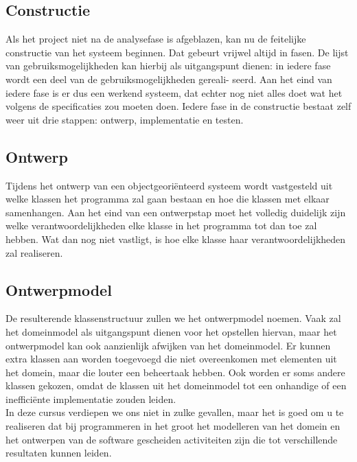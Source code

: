 \documentclass{article}
\begin{document}
	\subsection{Constructie}
	
	Als het project niet na de analysefase is afgeblazen, kan nu de feitelijke
	constructie van het systeem beginnen. Dat gebeurt vrijwel altijd in fasen.
	De lijst van gebruiksmogelijkheden kan hierbij als uitgangspunt dienen:
	in iedere fase wordt een deel van de gebruiksmogelijkheden gereali-
	seerd. Aan het eind van iedere fase is er dus een werkend systeem, dat
	echter nog niet alles doet wat het volgens de specificaties zou moeten
	doen. Iedere fase in de constructie bestaat zelf weer uit drie stappen:
	ontwerp, implementatie en testen.
	
	\subsection{Ontwerp}
	
	Tijdens het ontwerp van een objectgeoriënteerd systeem wordt vastgesteld uit welke klassen het programma zal gaan bestaan en hoe die
	klassen met elkaar samenhangen. Aan het eind van een ontwerpstap
	moet het volledig duidelijk zijn welke verantwoordelijkheden elke klasse
	in het programma tot dan toe zal hebben. Wat dan nog niet vastligt, is hoe elke klasse haar verantwoordelijkheden zal realiseren. 
	
	\subsection{Ontwerpmodel}
	
	De resulterende klassenstructuur zullen we het ontwerpmodel noemen. Vaak zal het domeinmodel als uitgangspunt dienen voor het opstellen hiervan, maar het ontwerpmodel kan ook aanzienlijk	afwijken van het domeinmodel. Er kunnen extra klassen aan worden
	toegevoegd die niet overeenkomen met elementen uit het domein, maar	die louter een beheertaak hebben. Ook worden er soms andere klassen gekozen, omdat de klassen uit het domeinmodel tot een onhandige of een inefficiënte implementatie zouden leiden. \\
	In deze cursus verdiepen we ons niet in zulke gevallen, maar het is goed om u te realiseren dat bij programmeren in het groot het modelleren van het domein en het ontwerpen van de software gescheiden activiteiten zijn die tot verschillende resultaten kunnen leiden. \\
	
\end{document}
